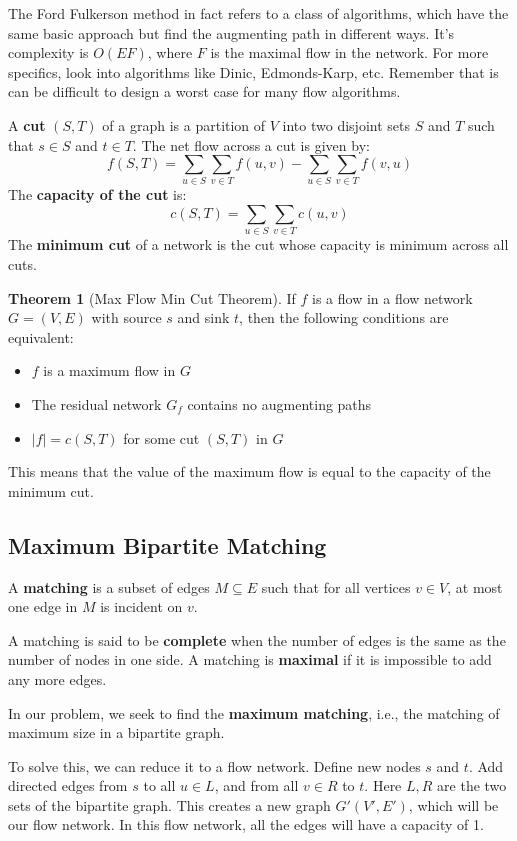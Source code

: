 \documentclass[12pt,letterpaper]{article}
\theoremstyle{definition}
\newtheorem{theorem}{Theorem}[section] %
\begin{document}
The Ford Fulkerson method in fact refers to a class of algorithms, which have the same basic approach but find the augmenting path in different ways. It's complexity is $O(EF)$, where $F$ is the maximal flow in the network. For more specifics, look into algorithms like Dinic, Edmonds-Karp, etc. Remember that is can be difficult to design a worst case for many flow algorithms.

A \textbf{cut} $(S,T)$ of a graph is a partition of $V$ into two disjoint sets $S$ and $T$ such that $s \in S$ and $t \in T$. The net flow across a cut is given by:
\[f(S,T) = \sum_{u \in S}\sum_{v \in T} f(u,v) - \sum_{u \in S} \sum_{v \in T} f(v,u)\]
The \textbf{capacity of the cut} is:
\[c(S,T) = \sum_{u \in S} \sum_{v \in T} c(u,v)\]
The \textbf{minimum cut} of a network is the cut whose capacity is minimum across all cuts.

\begin{theorem}[Max Flow Min Cut Theorem]
  If $f$ is a flow in a flow network $G=(V,E)$ with source $s$ and sink $t$, then the following conditions are equivalent:
  \begin{itemize}
    \item $f$ is a maximum flow in $G$
    \item The residual network $G_f$ contains no augmenting paths
    \item $|f| = c(S,T)$ for some cut $(S,T)$ in $G$
  \end{itemize}
\end{theorem}

This means that the value of the maximum flow is equal to the capacity of the minimum cut.

\subsection{Maximum Bipartite Matching}

A \textbf{matching}  is a subset of edges $M \subseteq E$ such that for all vertices $v \in V$, at most one edge in $M$ is incident on $v$.

A matching is said to be \textbf{complete}  when the number of edges is the same as the number of nodes in one side. A matching is \textbf{maximal} if it is impossible to add any more edges.

In our problem, we seek to find the \textbf{maximum matching}, i.e., the matching of maximum size in a bipartite graph.

To solve this, we can reduce it to a flow network. Define new nodes $s$ and $t$. Add directed edges from $s$ to all $u \in L$, and from all $v \in R$ to $t$. Here $L,R$ are the two sets of the bipartite graph. This creates a new graph $G'(V',E')$, which will be our flow network. In this flow network, all the edges will have a  capacity of 1.
\end{document}
